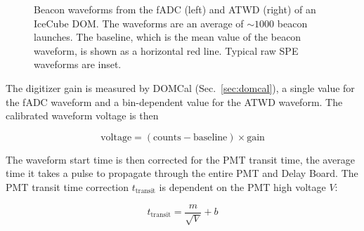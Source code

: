 \begin{figure}[!h]
  \captionsetup[subfigure]{labelformat=empty}
  \centering
  \caption{Beacon waveforms from the fADC (left) and ATWD (right) of
    an IceCube DOM. The waveforms are an average of $\sim1000$ beacon
   launches. The baseline, which is the mean value of the
    beacon waveform, is shown as a horizontal red line. Typical raw SPE
    waveforms are inset.}
  \label{fig:raw_baselines}
\end{figure}

The digitizer gain is measured by DOMCal (Sec.~\ref{sec:domcal}), a single
value for the fADC waveform and a bin-dependent value for the ATWD
waveform. The calibrated waveform voltage is then

\begin{equation}
  \mathrm{voltage} = \mathrm{(counts - baseline) \times gain}
\end{equation}

The waveform start time is then corrected for the PMT transit time,
the average time it takes a pulse to propagate through the entire
PMT and Delay Board. The PMT transit time correction $t_{\mathrm{transit}}$ is
dependent on the PMT high voltage $V$:

\begin{equation}
  t_{\mathrm{transit}} = \frac{m}{\sqrt{V}} + b
\end{equation}

